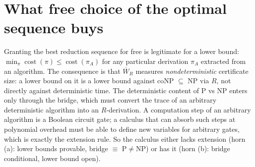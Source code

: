 \documentclass[11pt]{article}
\theoremstyle{definition}
\theoremstyle{remark}
\newcommand{\WR}[1]{\overline{W}_{#1}}
\begin{document}
\section{What free choice of the optimal sequence buys}
Granting the best reduction sequence for free is legitimate for a lower bound: $\min_\pi\operatorname{cost}(\pi)\le\operatorname{cost}(\pi_A)$
for any particular derivation $\pi_A$ extracted from an algorithm. The consequence is that $\WR{R}$ measures \emph{nondeterministic} certificate size:
a lower bound on it is a lower bound against coNP $\subseteq$ NP via $R$, not directly against deterministic time. The deterministic
content of P vs NP enters only through the bridge, which must convert the trace of an arbitrary deterministic algorithm into an $R$-derivation.
A computation step of an arbitrary algorithm is a Boolean circuit gate; a calculus that can absorb such steps at polynomial overhead must
be able to define new variables for arbitrary gates, which is exactly the extension rule. So the calculus either lacks extension
(horn (a): lower bounds provable, bridge $\equiv$ P$\ne$NP) or has it (horn (b): bridge conditional, lower bound open).
\end{document}
